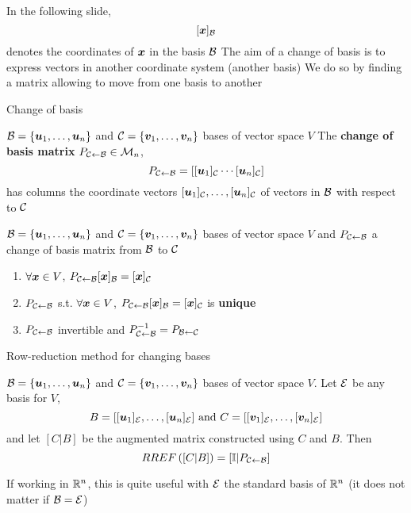 \documentclass[aspectratio=169]{beamer}\usepackage[]{graphicx}\usepackage[]{xcolor}
\begin{document}
\begin{frame}
	In the following slide, 
	\[
	[\bm{x}]_{\mathcal{B}}
	\]
	denotes the coordinates of $\bm{x}$ in the basis $\mathcal{B}$
	\vfill
	The aim of a change of basis is to express vectors in another coordinate system (another basis)
	\vfill
	We do so by finding a matrix allowing to move from one basis to another
\end{frame}

\begin{frame}{Change of basis}
\begin{definition}
$\mathcal{B}=\{\bm{u}_1,\ldots,\bm{u}_n\}$ and $\mathcal{C}=\{\bm{v}_1,\ldots,\bm{v}_n\}$ bases of vector space $V$
\vfill
The \textbf{change of basis matrix} $P_{\mathcal{C}\leftarrow\mathcal{B}}\in\mathcal{M}_n$,
\[
P_{\mathcal{C}\leftarrow\mathcal{B}}
=\left[
[\bm{u}_1]_{\mathcal{C}} \cdots [\bm{u}_n]_{\mathcal{C}}
\right]
\]
has columns the coordinate vectors $[\bm{u}_1]_{\mathcal{C}},\ldots,[\bm{u}_n]_{\mathcal{C}}$ of vectors in $\mathcal{B}$ with respect to $\mathcal{C}$
\end{definition}
\vfill
\begin{theorem}
$\mathcal{B}=\{\bm{u}_1,\ldots,\bm{u}_n\}$ and $\mathcal{C}=\{\bm{v}_1,\ldots,\bm{v}_n\}$ bases of vector space $V$ and $P_{\mathcal{C}\leftarrow\mathcal{B}}$ a change of basis matrix from $\mathcal{B}$ to $\mathcal{C}$
\begin{enumerate}
\item $\forall\bm{x}\in V$, $P_{\mathcal{C}\leftarrow\mathcal{B}}[\bm{x}]_{\mathcal{B}} = [\bm{x}]_{\mathcal{C}}$
\item $P_{\mathcal{C}\leftarrow\mathcal{B}}$ s.t. $\forall\bm{x}\in V$, $P_{\mathcal{C}\leftarrow\mathcal{B}}[\bm{x}]_{\mathcal{B}} = [\bm{x}]_{\mathcal{C}}$ is \textbf{unique}
\item $P_{\mathcal{C}\leftarrow\mathcal{B}}$ invertible and $P_{\mathcal{C}\leftarrow\mathcal{B}}^{-1}=P_{\mathcal{B}\leftarrow\mathcal{C}}$
\end{enumerate}
\end{theorem}
\end{frame}


\begin{frame}{Row-reduction method for changing bases}
\begin{importanttheorem}
\label{th:change-basis-construction}
$\mathcal{B}=\{\bm{u}_1,\ldots,\bm{u}_n\}$ and $\mathcal{C}=\{\bm{v}_1,\ldots,\bm{v}_n\}$ bases of vector space $V$. Let $\mathcal{E}$ be any basis for $V$,
\[
B = [[\bm{u}_1]_{\mathcal{E}},\ldots,[\bm{u}_n]_{\mathcal{E}}] 
\textrm{ and }
C = [[\bm{v}_1]_{\mathcal{E}},\ldots,[\bm{v}_n]_{\mathcal{E}}] 
\]
and let $[C|B]$ be the augmented matrix constructed using $C$ and $B$. Then
\[
RREF\left([C|B]\right)
=[\mathbb{I}|P_{\mathcal{C}\leftarrow\mathcal{B}}]
\]
\end{importanttheorem}
\vfill
If working in $\mathbb{R}^n$, this is quite useful with $\mathcal{E}$ the standard basis of $\mathbb{R}^n$ (it does not matter if $\mathcal{B}=\mathcal{E}$)
\end{frame}
\end{document}
